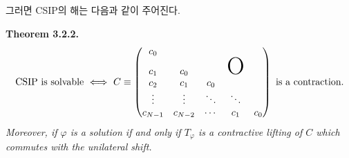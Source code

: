 \documentclass[12pt,a4paper,2sided]{article}
\begin{document}
그러면 CSIP의 해는 다음과 같이 주어진다.

\newpage{}

\vspace{0.8cm}



{\bf Theorem 3.2.2.} {\rm \cite{FF}} {\sl
$$
\mbox{CSIP is solvable}\ \Longleftrightarrow\ C\equiv
\begin{pmatrix}
c_0\\
c_1&c_0&&\mbox{\rm{\Huge{O}}}\\
c_2&c_1&c_0\\
\vdots&\vdots&\ddots&\ddots\\
c_{N-1}&c_{N-2}&\cdots&c_1&c_0
\end{pmatrix}\ \mbox{is a contraction.}
$$
Moreover, if $\varphi$ is a solution if and only if  $T_\varphi$
is a contractive lifting of $C$ which commutes with the unilateral
shift.}
\end{document}
